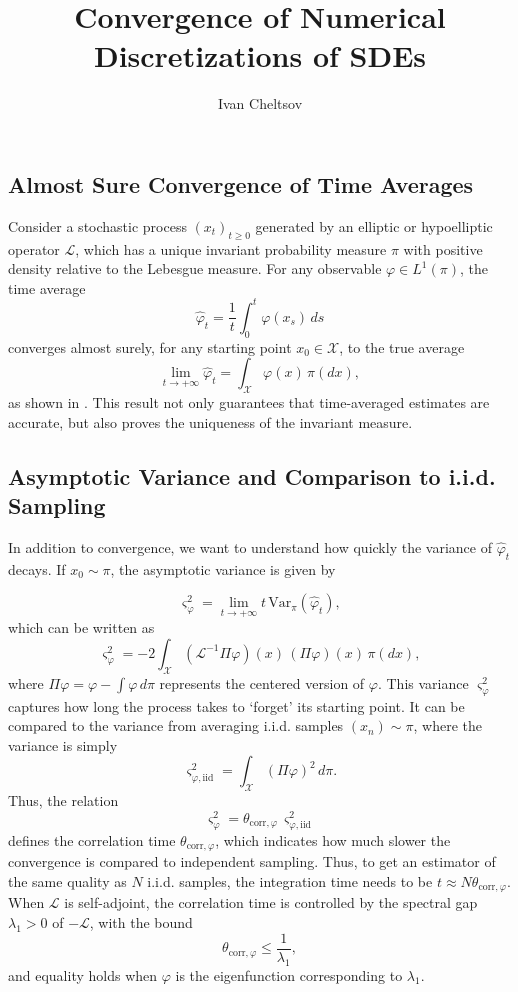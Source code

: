 \documentclass{article}
\title{Convergence of Numerical Discretizations of SDEs}
\author{%
 Ivan Cheltsov
}
\begin{document}
\maketitle

\subsection{Almost Sure Convergence of Time Averages}

Consider a stochastic process $(x_t)_{t \geq 0}$ generated by an elliptic or hypoelliptic operator $\mathcal{L}$, which has a unique invariant probability measure $\pi$ with positive density relative to the Lebesgue measure. For any observable $\varphi \in L^1(\pi)$, the time average
\[
\hat{\varphi}_t = \frac{1}{t} \int_0^t \varphi(x_s) \, ds
\]
converges almost surely, for any starting point $x_0 \in \mathcal{X}$, to the true average
\[
\lim_{t \to +\infty} \hat{\varphi}_t = \int_{\mathcal{X}} \varphi(x) \, \pi(dx),
\]
as shown in \cite{kliemann1987}.  
This result not only guarantees that time-averaged estimates are accurate, but also proves the uniqueness of the invariant measure.
\subsection{Asymptotic Variance and Comparison to i.i.d. Sampling}

In addition to convergence, we want to understand how quickly the variance of $\hat{\varphi}_t$ decays. If $x_0 \sim \pi$, the asymptotic variance is given by

\[
\varsigma_\varphi^2 = \lim_{t \to +\infty} t \, \mathrm{Var}_\pi(\hat{\varphi}_t),
\]
which can be written as \cite{Lelievre2016-hx}
\[
\varsigma_\varphi^2 = -2 \int_{\mathcal{X}} (\mathcal{L}^{-1} \Pi \varphi)(x) \, (\Pi \varphi)(x) \, \pi(dx),
\]
where $\Pi \varphi = \varphi - \int \varphi \, d\pi$ represents the centered version of $\varphi$. This variance $\varsigma_\varphi^2$ captures how long the process takes to `forget' its starting point. It can be compared to the variance from averaging i.i.d. samples $(x_n) \sim \pi$, where the variance is simply
\[
\varsigma_{\varphi, \text{iid}}^2 = \int_{\mathcal{X}} (\Pi \varphi)^2 \, d\pi.
\]
Thus, the relation
\[
\varsigma_\varphi^2 = \theta_{\text{corr}, \varphi} \, \varsigma_{\varphi, \text{iid}}^2
\]
defines the correlation time $\theta_{\text{corr}, \varphi}$, which indicates how much slower the convergence is compared to independent sampling. Thus, to get an estimator of the same quality as $N$ i.i.d. samples, the integration time needs to be $t \approx N \theta_{\text{corr}, \varphi}$. When $\mathcal{L}$ is self-adjoint, the correlation time is controlled by the spectral gap $\lambda_1 > 0$ of $-\mathcal{L}$, with the bound
\[
\theta_{\text{corr}, \varphi} \leq \frac{1}{\lambda_1},
\]
and equality holds when $\varphi$ is the eigenfunction corresponding to $\lambda_1$.
\end{document}
